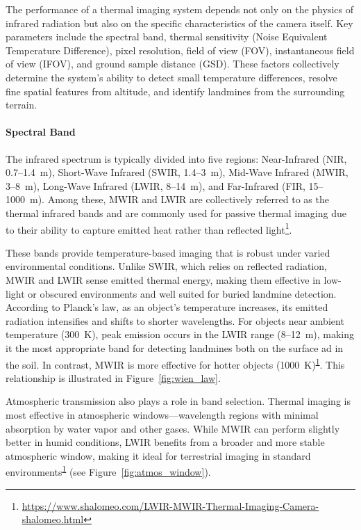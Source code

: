 The performance of a thermal imaging system depends not only on the physics of infrared radiation but also on the specific characteristics of the camera itself. Key parameters include the spectral band, thermal sensitivity (Noise Equivalent Temperature Difference), pixel resolution, field of view (FOV), instantaneous field of view (IFOV), and ground sample distance (GSD). These factors collectively determine the system’s ability to detect small temperature differences, resolve fine spatial features from altitude, and identify landmines from the surrounding terrain.


\paragraph{Spectral Band}

The infrared spectrum is typically divided into five regions: Near-Infrared (NIR, 0.7–1.4~\textmu m), Short-Wave Infrared (SWIR, 1.4–3~\textmu m), Mid-Wave Infrared (MWIR, 3–8~\textmu m), Long-Wave Infrared (LWIR, 8–14~\textmu m), and Far-Infrared (FIR, 15–1000~\textmu m). Among these, MWIR and LWIR are collectively referred to as the thermal infrared bands and are commonly used for passive thermal imaging due to their ability to capture emitted heat rather than reflected light\footnote{\label{LWIR}\url{https://www.shalomeo.com/LWIR-MWIR-Thermal-Imaging-Camera-shalomeo.html}}.

These bands provide temperature-based imaging that is robust under varied environmental conditions. Unlike SWIR, which relies on reflected radiation, MWIR and LWIR sense emitted thermal energy, making them effective in low-light or obscured environments and well suited for buried landmine detection. According to Planck’s law, as an object’s temperature increases, its emitted radiation intensifies and shifts to shorter wavelengths. For objects near ambient temperature (300~K), peak emission occurs in the LWIR range (8–12~\textmu m), making it the most appropriate band for detecting landmines both on the surface ad in the soil. In contrast, MWIR is more effective for hotter objects (1000~K)\textsuperscript{\ref{LWIR}}. This relationship is illustrated in Figure~\ref{fig:wien_law}.

Atmospheric transmission also plays a role in band selection. Thermal imaging is most effective in atmospheric windows—wavelength regions with minimal absorption by water vapor and other gases. While MWIR can perform slightly better in humid conditions, LWIR benefits from a broader and more stable atmospheric window, making it ideal for terrestrial imaging in standard environments\textsuperscript{\ref{LWIR}} (see Figure~\ref{fig:atmos_window}).

